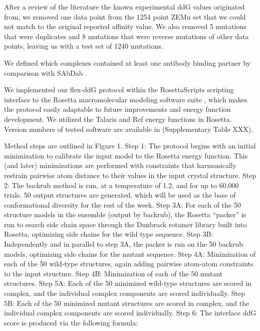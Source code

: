 After a review of the literature the known experimental ddG values originated from, we removed one data point from the 1254 point ZEMu set that we could not match to the original reported affinity value. We also removed 5 mutations that were duplicates and 8 mutations that were reverse mutations of other data points, leaving us with a test set of 1240 mutations.

We defined which complexes contained at least one antibody binding partner by comparison with SAbDab \cite{dunbar_sabdab:_2014}.

We implemented our flex-ddG protocol within the RosettaScripts scripting interface to the Rosetta macromolecular modeling software suite \cite{fleishman_rosettascripts_2011}, which makes the protocol easily adaptable to future improvements and energy function development. We utilized the Talaris \cite{leaver-fay_chapter_2013,song_structure-guided_2011,shapovalov_smoothed_2011} and Ref\cite{alford_rosetta_2017} energy functions in Rosetta. Version numbers of tested software are available in (Supplementary Table XXX).

Method steps are outlined in Figure 1. Step 1: The protocol begins with an initial minimization to calibrate the input model to the Rosetta energy function. This (and later) minimizations are performed with constraints that harmonically restrain pairwise atom distance to their values in the input crystal structure. Step 2: The backrub method is run, at a temperature of 1.2, and for up to 60,000 trials. 50 output structures are generated, which will be used as the base of conformational diversity for the rest of the week. Step 3A: For each of the 50 structure models in the ensemble (output by backrub), the Rosetta ``packer'' is run to search side chain space through the Dunbrack rotamer library built into Rosetta\cite{shapovalov_smoothed_2011}, optimizing side chains for the wild type sequence. Step 3B: Independently and in parallel to step 3A, the packer is run on the 50 backrub models, optimizing side chains for the mutant sequence. Step 4A: Minimization of each of the 50 wild-type structures, again adding pairwise atom-atom constraints to the input structure. Step 4B: Minimization of each of the 50 mutant structures. Step 5A: Each of the 50 minimized wild-type structures are scored in complex, and the individual complex components are scored individually. Step 5B: Each of the 50 minimized mutant structures are scored in complex, and the individual complex components are scored individually. Step 6: The interface ddG score is produced via the following formula:

